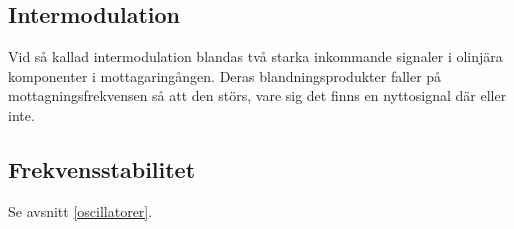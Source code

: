 \subsection{Intermodulation}

Vid så kallad intermodulation blandas två starka inkommande signaler i olinjära
komponenter i mottagaringången.
Deras blandningsprodukter faller på mottagningsfrekvensen så att den störs,
vare sig det finns en nyttosignal där eller inte.

\subsection{Frekvensstabilitet}

Se avsnitt \ref{oscillatorer}.
